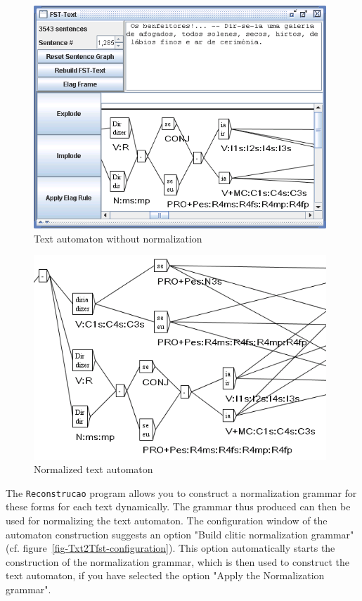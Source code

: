 \begin{figure}[!ht]
\begin{center}
\includegraphics[width=11cm]{resources/img/fig7-6.png}
\caption{Text automaton without normalization\label{fig-1285-not-normalized}}
\end{center}
\end{figure}
\begin{figure}[!ht]
\begin{center}
\includegraphics[width=11cm]{resources/img/fig7-7.png}
\caption{Normalized text automaton\label{fig-1285-normalized}}
\end{center}
\end{figure}
\clearpage

\bigskip
\noindent The \verb+Reconstrucao+ program allows you to construct a
normalization grammar for these forms for each text dynamically. The grammar thus produced can then be
used for normalizing the text automaton. The configuration window of the
automaton construction suggests an option "Build clitic normalization grammar"
(cf. figure~\ref{fig-Txt2Tfst-configuration}). This option
automatically starts the construction of the normalization grammar, which is then
used to construct the text automaton, if you have selected the option "Apply the
Normalization grammar".



